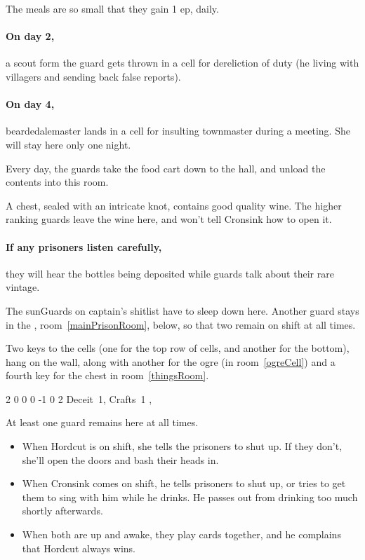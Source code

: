\begin{multicols}{2}
The meals are so small that they gain 1 \gls{ep}, daily.

\paragraph{On day 2,}
a scout form the \gls{guard} gets thrown in a cell for dereliction of duty (he living with villagers and sending back false reports).

\paragraph{On day 4,}
\gls{beardedalemaster} lands in a cell for insulting \gls{townmaster} during a meeting.
She will stay here only one night.


Every day, the guards take the food cart down to the hall, and unload the contents into this room.

A chest, sealed with an intricate knot, contains good quality wine.
The higher ranking guards leave the wine here, and won't tell Cronsink how to open it.

\paragraph{If any prisoners listen carefully,}
they will hear the bottles being deposited while guards talk about their rare vintage.


The \glspl{sunGuard} on \gls{captain}'s shitlist have to sleep down here.
Another guard stays in the , room~\ref{mainPrisonRoom}, below, so that two remain on shift at all times.

Two keys to the cells (one for the top row of cells, and another for the bottom), hang on the wall, along with another for the ogre (in room~\ref{ogreCell}) and a fourth key for the chest in room~\ref{thingsRoom}.

  {2}%
  {0}%
  {{0}%
  {0}%
  {-1}}%
  {0}%
  {2}%
  {
    Deceit~1, Crafts~1
    \knacks{\brawler, \berserker}
  }%
  {\shortsword, \partialplate}%
  {}


At least one guard remains here at all times.
\begin{itemize}
  \item
  When Hordcut is on shift, she tells the prisoners to shut up.
  If they don't, she'll open the doors and bash their heads in.
  \item
  When Cronsink comes on shift, he tells prisoners to shut up, or tries to get them to sing with him while he drinks.
  He passes out from drinking too much shortly afterwards.
  \item
  When both are up and awake, they play cards together, and he complains that Hordcut always wins.
\end{itemize}


\end{multicols}
